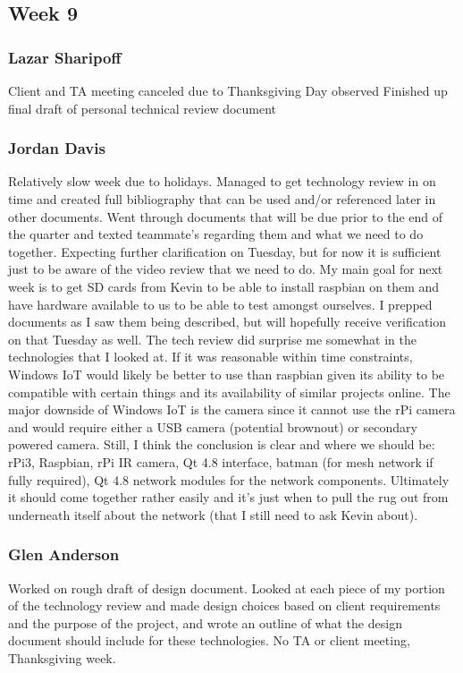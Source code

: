\documentclass[onecolumn, draftclsnofoot,10pt, compsoc]{IEEEtran}
\begin{document}
\subsection{Week 9}
\subsubsection{Lazar Sharipoff}
Client and TA meeting canceled due to Thanksgiving Day observed
\newline Finished up final draft of personal technical review document


\subsubsection{Jordan Davis}
Relatively slow week due to holidays. Managed to get technology review in on time and created full bibliography that can be used and/or referenced later in other documents. Went through documents that will be due prior to the end of the quarter and texted teammate's regarding them and what we need to do together. Expecting further clarification on Tuesday, but for now it is sufficient just to be aware of the video review that we need to do. My main goal for next week is to get SD cards from Kevin to be able to install raspbian on them and have hardware available to us to be able to test amongst ourselves. I prepped documents as I saw them being described, but will hopefully receive verification on that Tuesday as well. The tech review did surprise me somewhat in the technologies that I looked at. If it was reasonable within time constraints, Windows IoT would likely be better to use than raspbian given its ability to be compatible with certain things and its availability of similar projects online. The major downside of Windows IoT is the camera since it cannot use the rPi camera and would require either a USB camera (potential brownout) or secondary powered camera. Still, I think the conclusion is clear and where we should be: rPi3, Raspbian, rPi IR camera, Qt 4.8 interface, batman (for mesh network if fully required), Qt 4.8 network modules for the network components. Ultimately it should come together rather easily and it's just when to pull the rug out from underneath itself about the network (that I still need to ask Kevin about). 


\subsubsection{Glen Anderson}
Worked on rough draft of design document. Looked at each piece of my portion of the technology review and made design choices based on client requirements and the purpose of the project, and wrote an outline of what the design document should include for these technologies. No TA or client meeting, Thanksgiving week. 
\end{document}

